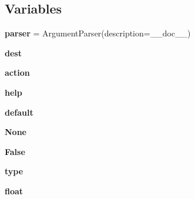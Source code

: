 \subsection*{Variables}
\begin{DoxyCompactItemize}
\item 
\mbox{\label{namespacepymavlink_1_1tools_1_1magfit__delta_a37f6299e5b342a2c410a0e17c651549b}} 
{\bfseries parser} = Argument\+Parser(description=\+\_\+\+\_\+doc\+\_\+\+\_\+)
\item 
\mbox{\label{namespacepymavlink_1_1tools_1_1magfit__delta_a6b314eb0e469046c618e88543d587e62}} 
{\bfseries dest}
\item 
\mbox{\label{namespacepymavlink_1_1tools_1_1magfit__delta_a445301a481ba8470ed0e71532fa37507}} 
{\bfseries action}
\item 
\mbox{\label{namespacepymavlink_1_1tools_1_1magfit__delta_ad846dac10406554ebeb632b9d3f107b9}} 
{\bfseries help}
\item 
\mbox{\label{namespacepymavlink_1_1tools_1_1magfit__delta_a261fe4d7d621f262d0a009313706fe14}} 
{\bfseries default}
\item 
\mbox{\label{namespacepymavlink_1_1tools_1_1magfit__delta_a6def289bdce6f45dd4680761b183e936}} 
{\bfseries None}
\item 
\mbox{\label{namespacepymavlink_1_1tools_1_1magfit__delta_acd5c17e0195e894925fd65d07bc88e2e}} 
{\bfseries False}
\item 
\mbox{\label{namespacepymavlink_1_1tools_1_1magfit__delta_a681501cd0f73dd27911da6741369837c}} 
{\bfseries type}
\item 
\mbox{\label{namespacepymavlink_1_1tools_1_1magfit__delta_a25223d75e5d8399cfa9e1902af055a4c}} 
{\bfseries float}
\item 

\end{DoxyCompactItemize}
